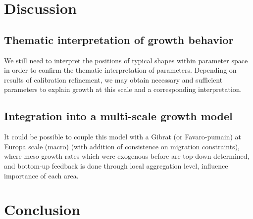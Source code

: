 \documentclass[10pt,letterpaper]{article}
\begin{document}




\section{Discussion}


\subsection{Thematic interpretation of growth behavior}

We still need to interpret the positions of typical shapes within parameter space in order to confirm the thematic interpretation of parameters. Depending on results of calibration refinement, we may obtain necessary and sufficient parameters to explain growth at this scale and a corresponding interpretation.



\subsection{Integration into a multi-scale growth model}

It could be possible to couple this model with a Gibrat (or Favaro-pumain) at Europa scale (macro) (with addition of consistence on migration constraints), where meso growth rates which were exogenous before are top-down determined, and bottom-up feedback is done through local aggregation level, influence importance of each area.












\section{Conclusion}
\end{document}
